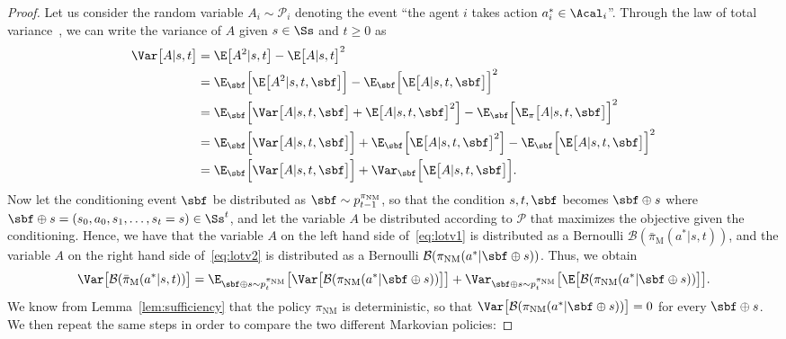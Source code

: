 \begin{proof}
	Let us consider the random variable $A_i \sim \mathcal{P}_i$ denoting the event ``the agent $i$ takes action $a^*_i \in \Acal_i$''. Through the law of total variance~\cite{bertsekas2002introduction}, we can write the variance of $A$ given $s \in \Ss$ and $t \geq 0$ as
	\begin{align}
		\Var \big[ A | s, t \big]
		&= \E \big[ A^2 | s, t \big] - \E \big[ A | s, t \big]^2 \nonumber \\
		&= \E_{\sbf} \Big[ \E \big[ A^2 | s, t,  \sbf  \big] \Big] - \E_{\sbf} \Big[ \E \big[ A | s, t, \sbf \big] \Big]^2 \nonumber \\
		&= \E_{\sbf} \Big[ \Var \big[ A | s, t,  \sbf  \big] + \E \big[ A | s, t,  \sbf  \big]^2 \Big]
		- \E_{\sbf} \Big[ \E_{\pi} \big[ A | s, t,  \sbf  \big] \Big]^2 \nonumber \\
		&= \E_{\sbf} \Big[ \Var \big[ A | s, t,  \sbf  \big] \Big] +\E_{\sbf} \Big[  \E \big[ A | s, t,  \sbf  \big]^2 \Big] - \E_{\sbf} \Big[ \E \big[ A | s, t,  \sbf  \big] \Big]^2 \nonumber \\
		&= \E_{\sbf} \Big[ \Var \big[ A | s, t,  \sbf  \big] \Big] + \Var_{ \sbf } \Big[ \E\big[ A | s, t,  \sbf  \big] \Big]. \label{eq:lotv1}
	\end{align}
	Now let the conditioning event $ \sbf $ be distributed as $ \sbf  \sim p^{\pi_{\text{NM}}}_{t - 1}$, so that the condition $s, t,  \sbf $ becomes $ \sbf  \oplus s$ where $\sbf  \oplus s = (s_{0}, a_{0}, s_{1}, \ldots, s_{t} = s) \in \Ss^t$, and let the variable $A$ be distributed according to $\mathcal{P}$ that maximizes the objective given the conditioning. Hence, we have that the variable $A$ on the left hand side of~\eqref{eq:lotv1} is distributed as a Bernoulli $\mathcal{B} (\bar \pi_{\text{M}} (a^* | s, t))$, and the variable $A$ on the right hand side of~\eqref{eq:lotv2} is distributed as a Bernoulli $\mathcal{B} (\pi_{\text{NM}} (a^* | \sbf  \oplus s))$. Thus, we obtain
	\begin{equation}
		\Var \big[ \mathcal{B} ( \bar \pi_{\text{M}} (a^*|s, t) ) \big] = \E_{\sbf  \oplus s \sim p^{\pi_{\text{NM}}}_t} \big[ \Var \big[ \mathcal{B} ( \pi_{\text{NM}} (a^* | \sbf  \oplus s) ) \big] \big] + \Var_{\sbf  \oplus s \sim p^{\pi_{\text{NM}}}_t} \big[ \E \big[ \mathcal{B} ( \pi_{\text{NM}} (a^* | \sbf  \oplus s) ) \big] \big].
	\label{eq:lotv2}
	\end{equation}
	We know from Lemma~\ref{lem:sufficiency} that the policy $\pi_{\text{NM}}$ is deterministic, so that $\Var \big[ \mathcal{B} ( \pi_{\text{NM}} (a^* | \sbf  \oplus s) ) \big] = 0$ for every $\sbf  \oplus s$. We then repeat the same steps in order to compare the two different Markovian policies:

\end{proof}
